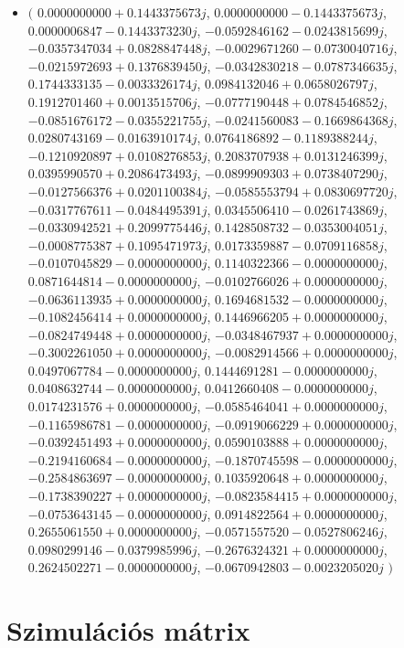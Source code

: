 \documentclass[14pt,a4paper]{article}
\begin{document}
\begin{itemize}
\item
$\big($
$0.0000000000+0.1443375673j$, $0.0000000000-0.1443375673j$, $0.0000006847-0.1443373230j$, $-0.0592846162-0.0243815699j$, $-0.0357347034+0.0828847448j$, $-0.0029671260-0.0730040716j$, $-0.0215972693+0.1376839450j$, $-0.0342830218-0.0787346635j$, $0.1744333135-0.0033326174j$, $0.0984132046+0.0658026797j$, $0.1912701460+0.0013515706j$, $-0.0777190448+0.0784546852j$, $-0.0851676172-0.0355221755j$, $-0.0241560083-0.1669864368j$, $0.0280743169-0.0163910174j$, $0.0764186892-0.1189388244j$, $-0.1210920897+0.0108276853j$, $0.2083707938+0.0131246399j$, $0.0395990570+0.2086473493j$, $-0.0899909303+0.0738407290j$, $-0.0127566376+0.0201100384j$, $-0.0585553794+0.0830697720j$, $-0.0317767611-0.0484495391j$, $0.0345506410-0.0261743869j$, $-0.0330942521+0.2099775446j$, $0.1428508732-0.0353004051j$, $-0.0008775387+0.1095471973j$, $0.0173359887-0.0709116858j$, $-0.0107045829-0.0000000000j$, $0.1140322366-0.0000000000j$, $0.0871644814-0.0000000000j$, $-0.0102766026+0.0000000000j$, $-0.0636113935+0.0000000000j$, $0.1694681532-0.0000000000j$, $-0.1082456414+0.0000000000j$, $0.1446966205+0.0000000000j$, $-0.0824749448+0.0000000000j$, $-0.0348467937+0.0000000000j$, $-0.3002261050+0.0000000000j$, $-0.0082914566+0.0000000000j$, $0.0497067784-0.0000000000j$, $0.1444691281-0.0000000000j$, $0.0408632744-0.0000000000j$, $0.0412660408-0.0000000000j$, $0.0174231576+0.0000000000j$, $-0.0585464041+0.0000000000j$, $-0.1165986781-0.0000000000j$, $-0.0919066229+0.0000000000j$, $-0.0392451493+0.0000000000j$, $0.0590103888+0.0000000000j$, $-0.2194160684-0.0000000000j$, $-0.1870745598-0.0000000000j$, $-0.2584863697-0.0000000000j$, $0.1035920648+0.0000000000j$, $-0.1738390227+0.0000000000j$, $-0.0823584415+0.0000000000j$, $-0.0753643145-0.0000000000j$, $0.0914822564+0.0000000000j$, $0.2655061550+0.0000000000j$, $-0.0571557520-0.0527806246j$, $0.0980299146-0.0379985996j$, $-0.2676324321+0.0000000000j$, $0.2624502271-0.0000000000j$, $-0.0670942803-0.0023205020j$
$\big)$
\end{itemize}
\section{Szimulációs mátrix}
\end{document}
